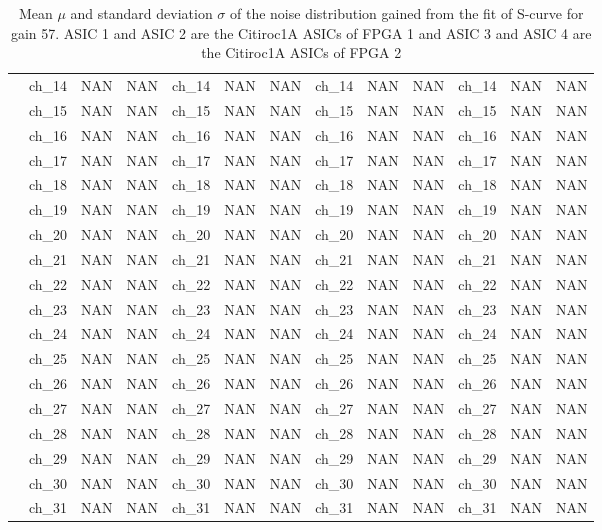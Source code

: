 \begin{table}
{\begin{tabular}{|c|c|c|c|c|c|c|c|c|c|c|c|c|}
        &ch\_14 & NAN & NAN & ch\_14 & NAN & NAN & ch\_14 & NAN & NAN & ch\_14 & NAN & NAN \\
        &ch\_15 & NAN & NAN & ch\_15 & NAN & NAN & ch\_15 & NAN & NAN & ch\_15 & NAN & NAN \\
        &ch\_16 & NAN & NAN & ch\_16 & NAN & NAN & ch\_16 & NAN & NAN & ch\_16 & NAN & NAN \\
        &ch\_17 & NAN & NAN & ch\_17 & NAN & NAN & ch\_17 & NAN & NAN & ch\_17 & NAN & NAN \\
        &ch\_18 & NAN & NAN & ch\_18 & NAN & NAN & ch\_18 & NAN & NAN & ch\_18 & NAN & NAN \\
        &ch\_19 & NAN & NAN & ch\_19 & NAN & NAN & ch\_19 & NAN & NAN & ch\_19 & NAN & NAN \\
        &ch\_20 & NAN & NAN & ch\_20 & NAN & NAN & ch\_20 & NAN & NAN & ch\_20 & NAN & NAN \\
        &ch\_21 & NAN & NAN & ch\_21 & NAN & NAN & ch\_21 & NAN & NAN & ch\_21 & NAN & NAN \\
        &ch\_22 & NAN & NAN & ch\_22 & NAN & NAN & ch\_22 & NAN & NAN & ch\_22 & NAN & NAN \\
        &ch\_23 & NAN & NAN & ch\_23 & NAN & NAN & ch\_23 & NAN & NAN & ch\_23 & NAN & NAN \\
        &ch\_24 & NAN & NAN & ch\_24 & NAN & NAN & ch\_24 & NAN & NAN & ch\_24 & NAN & NAN \\
        &ch\_25 & NAN & NAN & ch\_25 & NAN & NAN & ch\_25 & NAN & NAN & ch\_25 & NAN & NAN \\
        &ch\_26 & NAN & NAN & ch\_26 & NAN & NAN & ch\_26 & NAN & NAN & ch\_26 & NAN & NAN \\
        &ch\_27 & NAN & NAN & ch\_27 & NAN & NAN & ch\_27 & NAN & NAN & ch\_27 & NAN & NAN \\
        &ch\_28 & NAN & NAN & ch\_28 & NAN & NAN & ch\_28 & NAN & NAN & ch\_28 & NAN & NAN \\
        &ch\_29 & NAN & NAN & ch\_29 & NAN & NAN & ch\_29 & NAN & NAN & ch\_29 & NAN & NAN \\
        &ch\_30 & NAN & NAN & ch\_30 & NAN & NAN & ch\_30 & NAN & NAN & ch\_30 & NAN & NAN \\
        &ch\_31 & NAN & NAN & ch\_31 & NAN & NAN & ch\_31 & NAN & NAN & ch\_31 & NAN & NAN \\
        \hline
     
    \end{tabular}
    }
    \caption{Mean $\mu$ and standard deviation $\sigma$ of the noise distribution gained from the fit of S-curve for gain 57. ASIC 1 and ASIC 2 are the Citiroc1A ASICs of FPGA 1 and ASIC 3 and ASIC 4 are the Citiroc1A ASICs of FPGA 2}
    \label{tab:noise_parameter_1}
\end{table}
